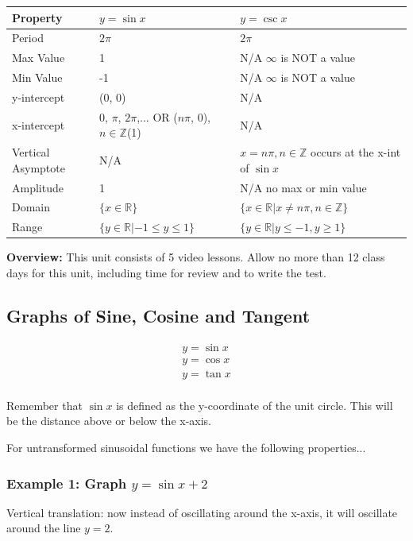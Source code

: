 \documentclass{article}
\begin{document}
\begin{tabular}{ |p{2cm}||p{5cm}|p{5cm}|  }
 \hline
 Property & $y = \sin x$ & $y = \csc x$\\
 \hline
 Period   & $2\pi$    & $2\pi$ \\
 \hline
 Max Value & 1 & N/A \textcolor{notecolor}{$\infty$ is NOT a value}\\
 \hline
 Min Value & -1 & N/A \textcolor{notecolor}{$\infty$ is NOT a value}\\
 \hline
 y-intercept & (0, 0) & N/A \\
 \hline
 x-intercept & 0, $\pi$, $2\pi$,... OR ($n\pi$, 0), $n\in \mathbb{Z}$(1)  & N/A\\
 \hline
 Vertical Asymptote & N/A & $x = n\pi, n\in \mathbb{Z}$ \textcolor{notecolor}{occurs at the x-int of $\sin x$}\\
 \hline
 Amplitude & 1 & N/A \textcolor{notecolor}{no max or min value}\\
 \hline
 Domain & $\{x\in \mathbb{R}\}$ & $\{x\in \mathbb{R}|x \neq n\pi, n\in \mathbb{Z} \}$\\
 \hline
 Range & $\{y\in \mathbb{R}|-1\leq y \leq 1\}$ & $\{y\in \mathbb{R}|y\leq -1, y \geq 1\}$\\
 \hline
\end{tabular}

\vspace{2em}

\textbf{Overview:} This unit consists of 5 video lessons. Allow no more than 12 class days for this unit, including time for review and to write the test.

\subsection{Graphs of Sine, Cosine and Tangent}
\[
\begin{array}{c}
y = \sin x \\
y = \cos x \\
y = \tan x \\
\end{array}
\]

\noindent Remember that \(\sin x\) is defined as the y-coordinate of the unit circle. This will be the distance above or below the x-axis.

\noindent For untransformed sinusoidal functions we have the following properties...

\subsubsection*{Example 1: Graph \( y = \sin x + 2 \)}
Vertical translation: now instead of oscillating around the x-axis, it will oscillate around the line \( y = 2 \).
\end{document}
